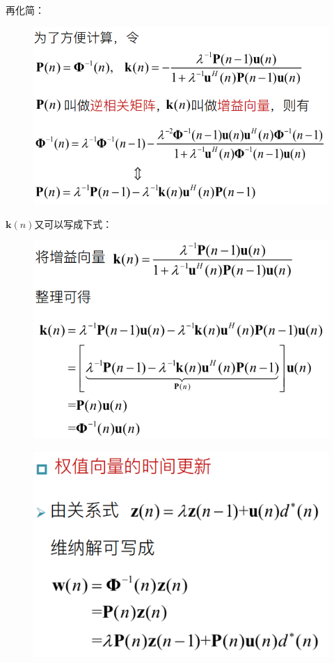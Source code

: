 \documentclass[UTF8]{ctexart} %
\begin{document}
				再化简：
				\begin{figure}[H]
					\centering\includegraphics[scale=0.4]{60.png}
				\end{figure}
				$\bm{k}(n)$又可以写成下式：
				\begin{figure}[H]
					\centering\includegraphics[scale=0.4]{61.png}
				\end{figure}
				\begin{figure}[H]
					\centering\includegraphics[scale=0.45]{62.png}
				\end{figure}
\end{document}
